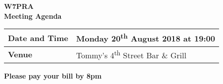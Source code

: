 \documentclass[letter,11pt]{extarticle}
\begin{document}
	\thispagestyle{empty}
	
	\begin{center}
		\textbf{W7PRA\\Meeting Agenda}
		\vspace{0.33cm}
	\end{center}
	
	\begin{center}
		\begin{tabular}{| m{3.0cm} | m{7.5cm} |} \hline
			\textbf{Date and Time} & Monday 20\textsuperscript{th} August 2018 at 19:00 \\ \hline
			\textbf{Venue} & Tommy's 4\textsuperscript{th} Street Bar \& Grill \\ \hline
				\end{tabular}
	\end{center}
	
	\begin{center}
		\textbf{Please pay your bill by 8pm}
	\end{center}
	
\end{document}
